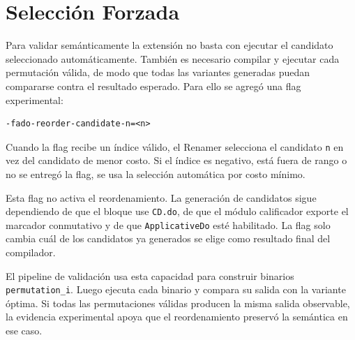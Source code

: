 
\section{Selección Forzada}

Para validar semánticamente la extensión no basta con ejecutar el candidato seleccionado automáticamente. También es necesario compilar y ejecutar cada permutación válida, de modo que todas las variantes generadas puedan compararse contra el resultado esperado. Para ello se agregó una flag experimental:

\begin{verbatim}
-fado-reorder-candidate-n=<n>
\end{verbatim}

Cuando la flag recibe un índice válido, el Renamer selecciona el candidato \texttt{n} en vez del candidato de menor costo. Si el índice es negativo, está fuera de rango o no se entregó la flag, se usa la selección automática por costo mínimo.

Esta flag no activa el reordenamiento. La generación de candidatos sigue dependiendo de que el bloque use \texttt{CD.do}, de que el módulo calificador exporte el marcador conmutativo y de que \texttt{ApplicativeDo} esté habilitado. La flag solo cambia cuál de los candidatos ya generados se elige como resultado final del compilador.

El pipeline de validación usa esta capacidad para construir binarios \texttt{permutation\_i}. Luego ejecuta cada binario y compara su salida con la variante óptima. Si todas las permutaciones válidas producen la misma salida observable, la evidencia experimental apoya que el reordenamiento preservó la semántica en ese caso.
